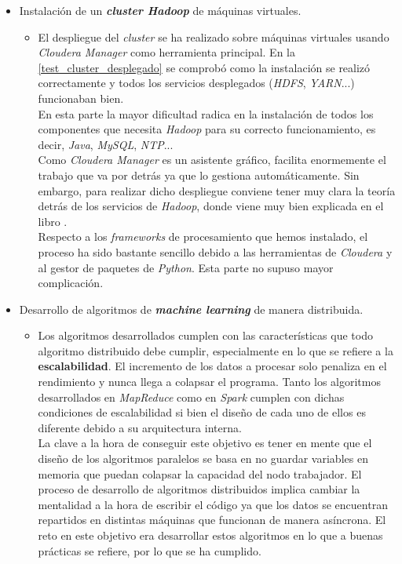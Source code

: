 \begin{itemize}
  \item Instalación de un \textbf{\textit{cluster Hadoop}} de máquinas virtuales.
  \begin{itemize}
    \item[] El despliegue del \textit{cluster} se ha realizado sobre máquinas virtuales usando \textit{Cloudera Manager}
            como herramienta principal. En la \autoref{test_cluster_desplegado} se comprobó como la instalación
            se realizó correctamente y todos los servicios desplegados (\textit{HDFS}, \textit{YARN}...) funcionaban bien.\\
            En esta parte la mayor dificultad radica en la instalación de todos los componentes que necesita 
            \textit{Hadoop} para su correcto funcionamiento, es decir, \textit{Java}, \textit{MySQL}, \textit{NTP}...\\
            Como \textit{Cloudera Manager} es un asistente gráfico, facilita enormemente el trabajo que va por detrás
            ya que lo gestiona automáticamente. Sin embargo, para realizar dicho despliegue conviene tener muy clara
            la teoría detrás de los servicios de \textit{Hadoop}, donde viene muy bien explicada en el libro 
            \cite{White:2009:HDG:1717298}.\\
            Respecto a los \textit{frameworks} de procesamiento que hemos instalado, el proceso ha sido bastante sencillo
            debido a las herramientas de \textit{Cloudera} y al gestor de paquetes de \textit{Python}. Esta parte no
            supuso mayor complicación.
  \end{itemize}
  \item Desarrollo de algoritmos de \textbf{\textit{machine learning}} de manera distribuida.
  \begin{itemize}
    \item[] Los algoritmos desarrollados cumplen con las características que todo algoritmo distribuido debe cumplir,
            especialmente en lo que se refiere a la \textbf{escalabilidad}. El incremento de los datos a procesar solo
            penaliza en el rendimiento y nunca llega a colapsar el programa. Tanto los algoritmos desarrollados en
            \textit{MapReduce} como en \textit{Spark} cumplen con dichas condiciones de escalabilidad si bien el diseño
            de cada uno de ellos es diferente debido a su arquitectura interna.\\
            La clave a la hora de conseguir este objetivo es tener en mente que el diseño de los algoritmos paralelos
            se basa en no guardar variables en memoria que puedan colapsar la capacidad del nodo trabajador.
            El proceso de desarrollo de algoritmos distribuidos implica cambiar la mentalidad a la hora de escribir
            el código ya que los datos se encuentran repartidos en distintas máquinas que funcionan de manera 
            asíncrona. El reto en este objetivo era desarrollar estos algoritmos en lo que a buenas prácticas se refiere,
            por lo que se ha cumplido.
  \end{itemize} 
\end{itemize}

